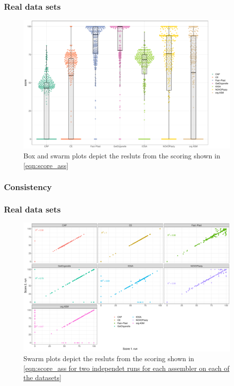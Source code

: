 \subsubsection{Real data sets}
\begin{figure}[H]
\centering
\includegraphics[height=.45\textheight, width=.95\textwidth]{Figures/swarm}
\decoRule
\caption[Scores of assemblies from real data sets]{Box and swarm plots depict the resluts from the scoring shown in \ref{eqn:score_ass}}
\label{fig:swarm}
\end{figure}




\subsubsection{Consistency}

\subsubsection{Real data sets}
\begin{figure}[H]
\centering
\includegraphics[height=.45\textheight, width=.95\textwidth]{Figures/repro}
\decoRule
\caption[Comparison between two uns with the same assembler for consistency testing ]{Swarm plots depict the resluts from the scoring shown in \ref{eqn:score_ass for two independet runs for each assembler on each of the datasets}}
\label{fig:consisplot}
\end{figure}


